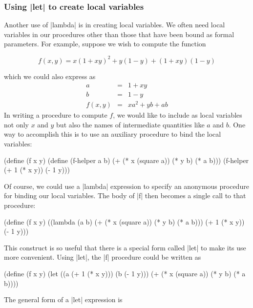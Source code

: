 \subsubsection*{Using \scheme|let| to create local variables}

Another use of \scheme|lambda| is in creating local variables.
We often need local variables in our procedures other than those that have
been bound as formal parameters.  For example, suppose we wish to
compute the function

\begin{displaymath}
  f(x,y) = x(1+xy)^2 + y(1-y) + (1+xy)(1-y)
\end{displaymath}

which we could also express as
\begin{eqnarray*}
  a & = & 1 + xy \\
  b & = & 1-y \\
  f(x,y) & = & xa^2 + yb + ab
\end{eqnarray*}
In writing a procedure to compute $f$, we would like to include as
local variables not only $x$ and $y$ but also the names of
intermediate quantities like $a$ and $b$.  One way to accomplish this
is to use an auxiliary procedure to bind the local variables:


\begin{schemedisplay}
(define (f x y)
  (define (f-helper a b)
    (+ (* x (square a))
       (* y b)
       (* a b)))
  (f-helper (+ 1 (* x y)) 
            (- 1 y)))
\end{schemedisplay}

Of course, we could use a \scheme|lambda| expression to specify an
anonymous procedure for binding our local variables.  The body of
\scheme|f| then becomes a single call to that procedure:


\begin{schemedisplay}
(define (f x y)
  ((lambda (a b)
     (+ (* x (square a))
        (* y b)
        (* a b)))
   (+ 1 (* x y))
   (- 1 y)))
\end{schemedisplay}
This construct is so useful that there is a special form called
\scheme|let| to make its use more convenient.  Using \scheme|let|, the
\scheme|f| procedure could be written as


\begin{schemedisplay}
(define (f x y)
  (let ((a (+ 1 (* x y)))
        (b (- 1 y)))
    (+ (* x (square a))
       (* y b)
       (* a b))))
\end{schemedisplay}
The general form of a \scheme|let| expression is


